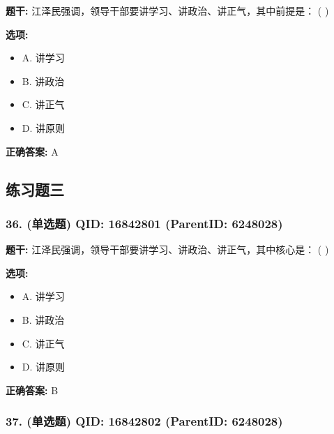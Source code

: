 \documentclass[12pt,UTF8]{ctexart}
\begin{document}
\textbf{题干:}
江泽民强调，领导干部要讲学习、讲政治、讲正气，其中前提是： ( )



\textbf{选项:}
\begin{itemize}[leftmargin=*]

  \item A. 讲学习

  \item B. 讲政治

  \item C. 讲正气

  \item D. 讲原则

\end{itemize}

\textbf{正确答案:}
A

\vspace{0.3em}\hrulefill\vspace{0.7em}

\subsection*{练习题三}

\subsubsection*{36. (单选题) \small QID: 16842801 (ParentID: 6248028)}

\textbf{题干:}
江泽民强调，领导干部要讲学习、讲政治、讲正气，其中核心是： ( )



\textbf{选项:}
\begin{itemize}[leftmargin=*]

  \item A. 讲学习

  \item B. 讲政治

  \item C. 讲正气

  \item D. 讲原则

\end{itemize}

\textbf{正确答案:}
B

\vspace{0.3em}\hrulefill\vspace{0.7em}

\subsubsection*{37. (单选题) \small QID: 16842802 (ParentID: 6248028)}
\end{document}
